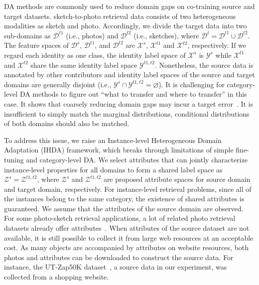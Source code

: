 \documentclass[journal]{IEEEtran}
\begin{document}
DA methods are commonly used to reduce domain gaps on co-training source and target datasets. sketch-to-photo retrieval data consists of two heterogeneous modalities as sketch and photo. Accordingly, we divide the target data into two sub-domains as $\mathcal{D}^{t1}$ (i.e., photos) and $\mathcal{D}^{t2}$ (i.e., sketches), where $\mathcal{D}^t=\mathcal{D}^{t1} \cup \mathcal{D}^{t2}$. The feature spaces of $\mathcal{D}^{s}$, $\mathcal{D}^{t1}$, and $\mathcal{D}^{t2}$ are $\mathcal{X}^{s}$, $\mathcal{X}^{t1}$ and $\mathcal{X}^{t2}$, respectively. If we regard each identity as one class, the identity label space of $\mathcal{X}^{s}$ is $\mathcal{Y}^{s}$ while $\mathcal{X}^{t1}$ and $\mathcal{X}^{t2}$ share the same identity label space $\mathcal{Y}^{t1,t2}$. Nonetheless, the source data is annotated by other contributors and identity label spaces of the source and target domains are generally disjoint (i.e., $\mathcal{Y}^{s} \cap \mathcal{Y}^{t1,t2} = \varnothing$). It is challenging for category-level DA methods to figure out ``what to transfer and where to transfer'' in this case. It shows that coarsely reducing domain gaps may incur a target error~\cite{saito2017asymmetric}. It is insufficient to simply match the marginal distributions, conditional distributions of both domains should also be matched.

To address this issue, we raise an Instance-level Heterogeneous Domain Adaptation (IHDA) framework, which breaks through limitations of simple fine-tuning and category-level DA. We select attributes that can jointly characterize instance-level properties for all domains to form a shared label space as $\mathcal{Z}^{s}=\mathcal{Z}^{t1,t2}$, where $\mathcal{Z}^{s}$ and $\mathcal{Z}^{t1,t2}$ are proposed attribute spaces for source domain and target domain, respectively. For instance-level retrieval problems, since all of the instances belong to the same category, the existence of shared attributes is guaranteed. We assume that the attributes of the source domain are observed. For some photo-sketch retrieval applications, a lot of related photo retrieval datasets already offer attributes~\cite{liu2015faceattributes,lin2019improving}. When attributes of the source dataset are not available, it is still possible to collect it from large web resources at an acceptable cost. As many objects are accompanied by attributes on website resources, both photos and attributes can be downloaded to construct the source data. For instance, the UT-Zap50K dataset~\cite{semjitter}, a source data in our experiment, was collected from a shopping website.
\end{document}
